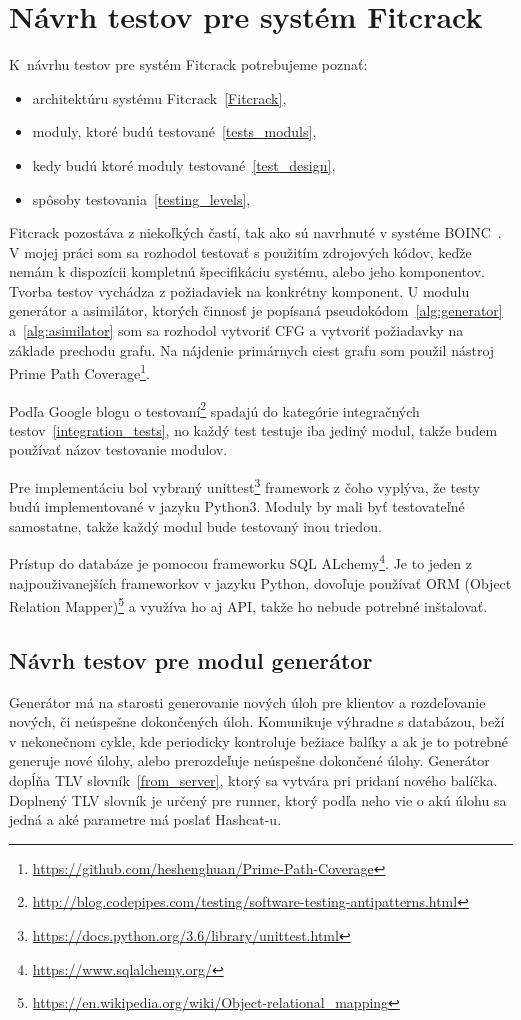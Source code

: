 \chapter{Návrh testov pre systém Fitcrack}
K~návrhu testov pre systém Fitcrack potrebujeme poznať:
\begin{itemize}
	\item architektúru systému Fitcrack~\ref{Fitcrack},
	\item moduly, ktoré budú testované~\ref{tests_moduls},
	\item kedy budú ktoré moduly testované~\ref{test_design},
	\item spôsoby testovania~\ref{testing_levels},
\end{itemize}
Fitcrack pozostáva z niekoľkých častí, tak ako sú navrhnuté v systéme BOINC~\cite{boincintro}.
V mojej práci som sa rozhodol testovať s použitím zdrojových kódov, keďže nemám k dispozícii kompletnú špecifikáciu systému, alebo jeho komponentov. 
Tvorba testov vychádza z požiadaviek na konkrétny komponent.
U modulu generátor a asimilátor, ktorých činnosť je popísaná pseudokódom~\ref{alg:generator} a~\ref{alg:asimilator} som sa rozhodol vytvoriť CFG a vytvoriť požiadavky na základe prechodu grafu. 
Na nájdenie primárnych ciest grafu som použil nástroj Prime Path Coverage\footnote{\url{https://github.com/heshenghuan/Prime-Path-Coverage}}.

Podľa Google blogu o testovaní\footnote{\url{http://blog.codepipes.com/testing/software-testing-antipatterns.html}} spadajú do kategórie integračných testov~\ref{integration_tests}, no každý test testuje iba jediný modul, takže budem používať názov testovanie modulov.

Pre implementáciu bol vybraný unittest\footnote{\url{https://docs.python.org/3.6/library/unittest.html}} framework z čoho vyplýva, že testy budú implementované v jazyku Python3.
Moduly by mali byť testovateľné samostatne, takže každý modul bude testovaný inou triedou.

Prístup do databáze je pomocou frameworku SQL ALchemy\footnote{\url{https://www.sqlalchemy.org/}}.
Je to jeden z najpouživanejších frameworkov v jazyku Python, dovoľuje používať ORM (Object Relation Mapper)\footnote{\url{https://en.wikipedia.org/wiki/Object-relational_mapping}} a využíva ho aj API, takže ho nebude potrebné inštalovať.


\section{Návrh testov pre modul generátor}
Generátor má na starosti generovanie nových úloh pre klientov a rozdeľovanie nových, či neúspešne dokončených úloh. 
Komunikuje výhradne s databázou, beží v nekonečnom cykle, kde periodicky kontroluje bežiace balíky a ak je to potrebné generuje nové úlohy, alebo prerozdeľuje neúspešne dokončené úlohy.
Generátor dopĺňa TLV slovník~\ref{from_server}, ktorý sa vytvára pri pridaní nového balíčka.
Doplnený TLV slovník je určený pre runner, ktorý podľa neho vie o akú úlohu sa jedná a aké parametre má poslať Hashcat-u.


